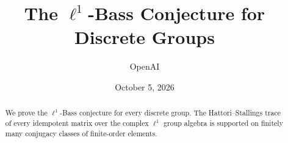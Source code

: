 \documentclass[11pt]{article}
\title{The $\ell^1$-Bass Conjecture for Discrete Groups}
\author{OpenAI}
\date{October 5, 2026}
\begin{document}
\maketitle
\begin{abstract}
We prove the $\ell^1$-Bass conjecture for every discrete group. The
Hattori--Stallings trace of every idempotent matrix over the complex
$\ell^1$ group algebra is supported on finitely many conjugacy classes
of finite-order elements.
\end{abstract}









\end{document}
